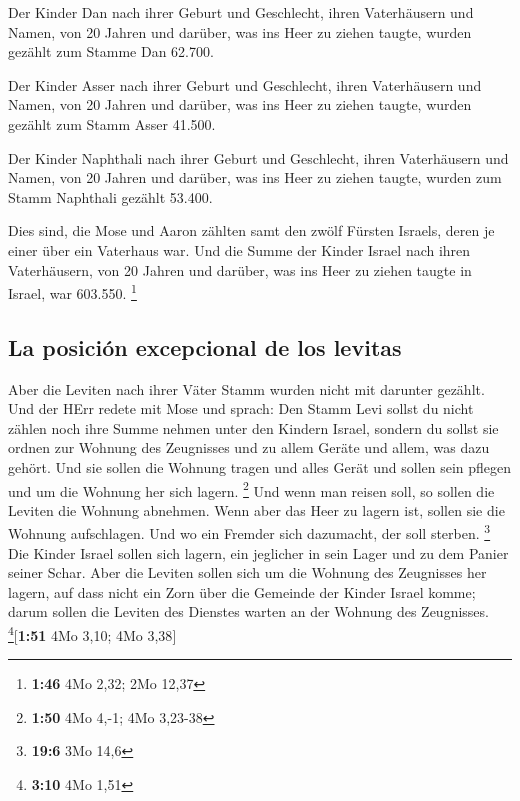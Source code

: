  Der Kinder Dan nach ihrer Geburt und Geschlecht, ihren
Vaterhäusern und Namen, von 20 Jahren und darüber, was ins Heer zu
ziehen taugte,  wurden gezählt zum Stamme Dan 62.700.

 Der Kinder Asser nach ihrer Geburt und Geschlecht, ihren
Vaterhäusern und Namen, von 20 Jahren und darüber, was ins Heer zu
ziehen taugte,  wurden gezählt zum Stamm Asser 41.500.

 Der Kinder Naphthali nach ihrer Geburt und Geschlecht,
ihren Vaterhäusern und Namen, von 20 Jahren und darüber, was ins Heer zu
ziehen taugte,  wurden zum Stamm Naphthali gezählt
53.400.

 Dies sind, die Mose und Aaron zählten samt den zwölf
Fürsten Israels, deren je einer über ein Vaterhaus war. 
Und die Summe der Kinder Israel nach ihren Vaterhäusern, von 20 Jahren
und darüber, was ins Heer zu ziehen taugte in Israel, 
war 603.550. \footnote{\textbf{1:46} 4Mo 2,32; 2Mo 12,37}

\hypertarget{la-posiciuxf3n-excepcional-de-los-levitas}{%
\subsection{La posición excepcional de los
levitas}\label{la-posiciuxf3n-excepcional-de-los-levitas}}

 Aber die Leviten nach ihrer Väter Stamm wurden nicht mit
darunter gezählt.  Und der HErr redete mit Mose und
sprach:  Den Stamm Levi sollst du nicht zählen noch ihre
Summe nehmen unter den Kindern Israel,  sondern du sollst
sie ordnen zur Wohnung des Zeugnisses und zu allem Geräte und allem, was
dazu gehört. Und sie sollen die Wohnung tragen und alles Gerät und
sollen sein pflegen und um die Wohnung her sich lagern. \footnote{\textbf{1:50}
  4Mo 4,-1; 4Mo 3,23-38}  Und wenn man reisen soll, so
sollen die Leviten die Wohnung abnehmen. Wenn aber das Heer zu lagern
ist, sollen sie die Wohnung aufschlagen. Und wo ein Fremder sich
dazumacht, der soll sterben. \footnote{\textbf{19:6} 3Mo 14,6}
 Die Kinder Israel sollen sich lagern, ein jeglicher in
sein Lager und zu dem Panier seiner Schar.  Aber die
Leviten sollen sich um die Wohnung des Zeugnisses her lagern, auf dass
nicht ein Zorn über die Gemeinde der Kinder Israel komme; darum sollen
die Leviten des Dienstes warten an der Wohnung des Zeugnisses.
\footnote{\textbf{3:10} 4Mo 1,51}{[}\textbf{1:51} 4Mo 3,10; 4Mo 3,38{]}

